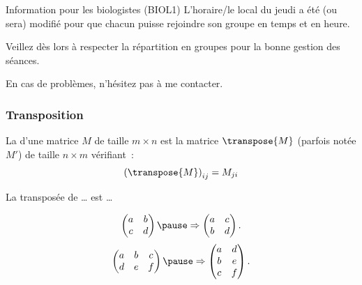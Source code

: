 \begin{frame}{Information pour les biologistes (BIOL1)}
  L'horaire/le local du jeudi a été (ou sera) modifié pour que chacun puisse rejoindre son groupe en temps et en heure.

  Veillez dès lors à respecter la répartition en groupes pour la bonne gestion des séances.

  En cas de problèmes, n'hésitez pas à me contacter.
\end{frame}

\subsubsection{Transposition}
\begin{frame}
  \begin{definition}\pause{}
    La  d'une matrice \(M\) de taille \(m\times n\) est\pause{} la matrice \(\transpose{M}\)
 (parfois notée \(M'\))\pause{} de taille \(n \times m\)\pause{} vérifiant~:
    \begin{equation*}
      {(\transpose{M})}_{ij} = M_{ji}
    \end{equation*}
  \end{definition}\pause{}
  \begin{example}
    La transposée de \dots{} est \dots{}

    \begin{equation*}
      \begin{pmatrix}
        a & b\\
        c & d
      \end{pmatrix}\pause
      \Rightarrow
      \begin{pmatrix}
        a & c\\
        b & d
      \end{pmatrix}.
    \end{equation*}\pause{}
    \begin{equation*}
      \begin{pmatrix}
        a & b & c\\
        d&e&f
      \end{pmatrix}\pause
      \Rightarrow
      \begin{pmatrix}
        a&d\\
        b&e\\
        c&f
      \end{pmatrix}.
    \end{equation*}
  \end{example}
\end{frame}


